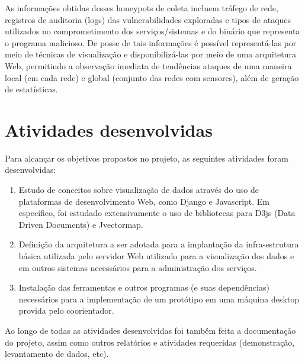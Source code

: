 As informações obtidas desses honeypots de coleta incluem tráfego de rede, registros de auditoria (logs) das vulnerabilidades exploradas e tipos de ataques utilizados no comprometimento dos serviços/sistemas e do binário que representa o programa malicioso. De posse de tais informações é possível representá-las  por meio de técnicas de visualização e disponibilizá-las por meio de uma arquitetura Web, permitindo a observação imediata de tendências ataques de uma maneira local (em cada rede) e global (conjunto das redes com sensores), além de geração de estatísticas.



\chapter{Atividades desenvolvidas}
Para alcançar os objetivos propostos no projeto, as seguintes atividades foram desenvolvidas:

\begin{enumerate}
\item Estudo de conceitos sobre visualização de dados através do uso de plataformas de desenvolvimento Web, como Django e Javascript. Em específico, foi estudado extensivamente o uso de bibliotecas para D3js\cite{d3js} (Data Driven Documents) e Jvectormap.\\
\item Definição da arquitetura a ser adotada para a implantação da infra-estrutura básica utilizada pelo servidor Web utilizado para a visualização dos dados e em outros sistemas necessários para a administração dos serviços.\\
\item Instalação das ferramentas e outros programas (e suas dependências) necessários para a implementação de um protótipo em uma máquina desktop provida pelo coorientador.\\
\end{enumerate}

Ao longo de todas as atividades desenvolvidas foi també́m feita a documentação do projeto, assim como outros relatórios e atividades requeridas (demonstração, levantamento de dados, etc).


